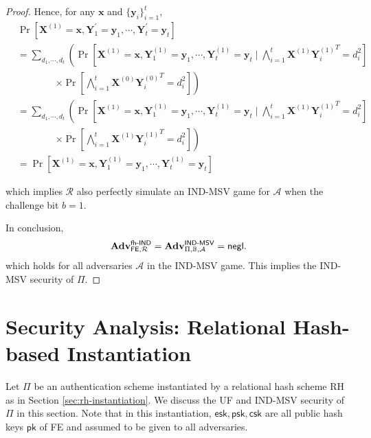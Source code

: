 \begin{proof}
Hence, for any $\mathbf{x}$ and $\{ \mathbf{y}_i \}_{i=1}^t$,
\begin{align*}
	& \Pr [\mathbf{X}^{(1)} = \mathbf{x}, \mathbf{Y}^\prime_1 = \mathbf{y}_1, \cdots, \mathbf{Y}^\prime_t = \mathbf{y}_t] \\
	&= \sum_{d_1, \cdots, d_t} \left( \Pr \left[\mathbf{X}^{(1)} = \mathbf{x}, \mathbf{Y}^{(1)}_1 = \mathbf{y}_1, \cdots, \mathbf{Y}^{(1)}_t = \mathbf{y}_t \mid \bigwedge_{i=1}^t \mathbf{X}^{(1)} {\mathbf{Y}^{(1)}_i}^T = d_i^2 \right] \right. \\
	&\qquad \qquad \left. \times \Pr \left[\bigwedge_{i=1}^t \mathbf{X}^{(0)} {\mathbf{Y}_i^{(0)}}^T = d_i^2 \right] \right) \\
	&= \sum_{d_1, \cdots, d_t} \left( \Pr \left[\mathbf{X}^{(1)} = \mathbf{x}, \mathbf{Y}^{(1)}_1 = \mathbf{y}_1, \cdots, \mathbf{Y}^{(1)}_t = \mathbf{y}_t \mid \bigwedge_{i=1}^t \mathbf{X}^{(1)} {\mathbf{Y}^{(1)}_i}^T = d_i^2 \right] \right. \\
	&\qquad \qquad \left. \times \Pr \left[\bigwedge_{i=1}^t \mathbf{X}^{(1)} {\mathbf{Y}_i^{(1)}}^T = d_i^2 \right] \right) \\
	&= \Pr[\mathbf{X}^{(1)} = \mathbf{x}, \mathbf{Y}^{(1)}_1 = \mathbf{y}_1, \cdots, \mathbf{Y}^{(1)}_t = \mathbf{y}_t ]
\end{align*}

\noindent which implies $\mathcal{R}$ also perfectly simulate an \textsf{IND-MSV} game for $\mathcal{A}$ when the challenge bit $b = 1$.

In conclusion, 
\[
	\mathbf{Adv}_{\textsf{FE}, \mathcal{R}}^\textsf{fh-IND} = \mathbf{Adv}_{\Pi, \mathbb{B}, \mathcal{A}}^\textsf{IND-MSV} = \mathsf{negl}.
\]
which holds for all adversaries $\mathcal{A}$ in the \textsf{IND-MSV} game. This implies the IND-MSV security of $\Pi$.


\end{proof}




\section{Security Analysis: Relational Hash-based Instantiation}
\label{sec:security_analysis:rh}

Let $\Pi$ be an authentication scheme instantiated by a relational hash scheme \textsf{RH} as in Section \ref{sec:rh-instantiation}. We discuss the UF and IND-MSV security of $\Pi$ in this section. Note that in this instantiation, $\textsf{esk}, \textsf{psk}, \textsf{csk}$ are all public hash keys $\textsf{pk}$ of \textsf{FE} and assumed to be given to all adversaries.

